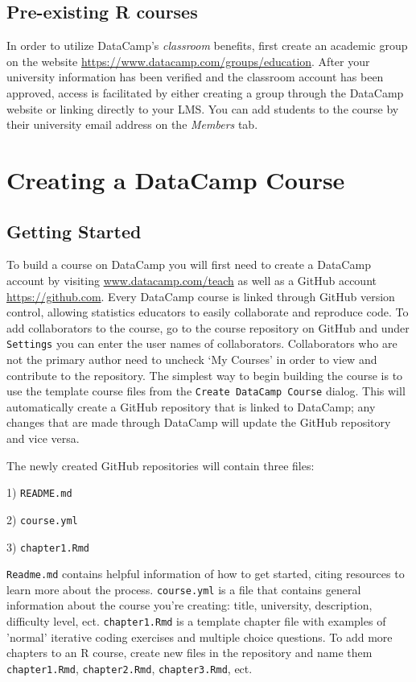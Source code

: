 \documentclass[12pt]{article}\usepackage[]{graphicx}\usepackage[]{color}
\begin{document}
\subsection{Pre-existing R courses}
In order to utilize 
DataCamp's \textit{classroom} benefits, first create an academic group on the website \url{https://www.datacamp.com/groups/education}.
After your university information has been verified and the classroom account has been approved, access is facilitated 
by either creating a group through the DataCamp website or linking directly to your LMS. You can add students to the course by their university email address on the \textit{Members} tab.
\section{Creating a DataCamp Course}
\subsection{Getting Started}
To build a course on DataCamp you will first need to create a DataCamp account by visiting \url{www.datacamp.com/teach} as well as
a GitHub account \url{https://github.com}. Every DataCamp course is linked through GitHub version control,
allowing statistics educators to easily collaborate and reproduce code. To add collaborators to the course, go to the course repository
on GitHub and under \texttt{Settings} you can enter the user names of collaborators. Collaborators who are not the primary author need 
to uncheck `My Courses' in order to view and contribute to the repository. The simplest way to begin building the course is to use the template course files from the
\texttt{Create DataCamp Course} dialog. This will automatically create a GitHub repository that is linked to DataCamp; any changes that are
made through DataCamp will update the GitHub repository and vice versa. 

The newly created GitHub repositories will contain three files: 

1) \texttt{README.md}

2) \texttt{course.yml}

3) \texttt{chapter1.Rmd}

\texttt{Readme.md} contains helpful information of how to get started, citing resources to learn more about the process.
\texttt{course.yml} is a file that contains general information about the course you're creating: title, university, description,
difficulty level, ect.
\texttt{chapter1.Rmd} is a template chapter file with examples of 'normal' iterative coding exercises and multiple choice questions.
To add more chapters to an R course, create new files in the repository and name them \texttt{chapter1.Rmd}, \texttt{chapter2.Rmd},
\texttt{chapter3.Rmd}, ect.
\end{document}
